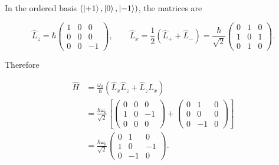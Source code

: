 \documentclass[11pt,a4paper]{scrartcl}
\newcommand{\op}[1]{\hat{#1}}
\begin{document}
\begin{enumerate}[label=(\alph*)]
\begin{calculationbox}
            In the ordered basis $(\ket{+1},\ket{0},\ket{-1})$, the matrices are
            \begin{calculationbox}
                \[
                    \op{L}_z
                    =\hbar
                    \begin{pmatrix}
                        1&0&0\\
                        0&0&0\\
                        0&0&-1
                    \end{pmatrix},
                    \qquad
                    \op{L}_x
                    =\frac12(\op{L}_++\op{L}_-)
                    =\frac{\hbar}{\sqrt{2}}
                    \begin{pmatrix}
                        0&1&0\\
                        1&0&1\\
                        0&1&0
                    \end{pmatrix}.
                \]
            \end{calculationbox}

            Therefore
            \begin{calculationbox}
                \begin{align*}
                    \op{H}
                    &=\frac{\omega_0}{\hbar}(\op{L}_x\op{L}_z+\op{L}_z\op{L}_x) \\
                    &=\frac{\hbar\omega_0}{\sqrt{2}}
                    \left[
                    \begin{pmatrix}
                        0&0&0\\
                        1&0&-1\\
                        0&0&0
                    \end{pmatrix}
                    +
                    \begin{pmatrix}
                        0&1&0\\
                        0&0&0\\
                        0&-1&0
                    \end{pmatrix}
                    \right] \\
                    &=\frac{\hbar\omega_0}{\sqrt{2}}
                    \begin{pmatrix}
                        0&1&0\\
                        1&0&-1\\
                        0&-1&0
                    \end{pmatrix}.
                \end{align*}
            \end{calculationbox}


\end{calculationbox}
\end{enumerate}
\end{document}
